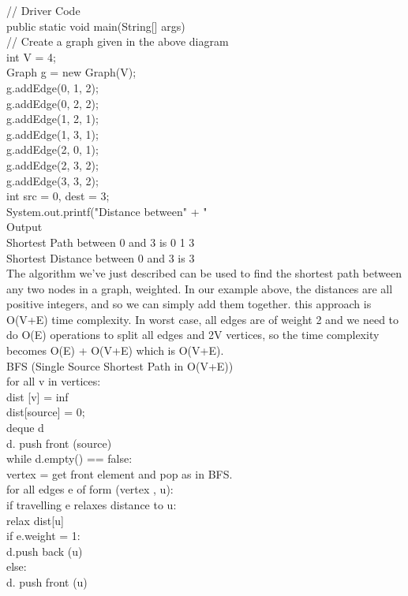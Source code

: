 \documentclass{article}
\begin{document}
\begin{enumerate}
{	// Driver Code\\
	public static void main(String[] args)\\
	{
		// Create a graph given in the above diagram\\
		int V = 4;\\
		Graph g = new Graph(V);\\
		g.addEdge(0, 1, 2);\\
		g.addEdge(0, 2, 2);\\
		g.addEdge(1, 2, 1);\\
		g.addEdge(1, 3, 1);\\
		g.addEdge(2, 0, 1);\\
		g.addEdge(2, 3, 2);\\
		g.addEdge(3, 3, 2);\\
		int src = 0, dest = 3;\\
		System.out.printf("\nShortest Distance between" + " %
	}
}
\\

Output\\
Shortest Path between 0 and 3 is 0 1 3 \\
Shortest Distance between 0 and 3 is 3\\
The algorithm we've just described can be used to find the shortest path between any two nodes in a graph, weighted. In our example above, the distances are all positive integers, and so we can simply add them together. this approach is O(V+E) time complexity. In worst case, all edges are of weight 2 and we need to do O(E) operations to split all edges and 2V vertices, so the time complexity becomes O(E) + O(V+E) which is O(V+E).\\

BFS (Single Source Shortest Path in O(V+E))\\
for all v in vertices:\\
dist [v] = inf\\
dist[source] = 0;\\
deque d\\
d. push front (source)\\
while d.empty() == false:\\
vertex = get front element and pop as in BFS.\\
for all edges e of form (vertex , u):\\
if travelling e relaxes distance to u:\\
relax dist[u]\\
if e.weight = 1:\\
d.push back (u)\\
else:\\
d. push front (u)\\


\end{enumerate}
\end{document}
